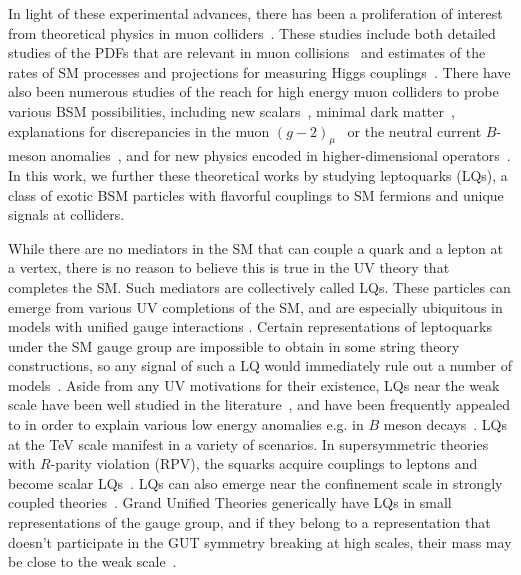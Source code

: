 \documentclass[a4paper,11pt]{article}
\begin{document}
In light of these experimental advances, there has been a proliferation of interest from theoretical physics in muon colliders~\cite{Ali:2021xlw}. 
These studies include both detailed studies of the PDFs that are relevant in muon collisions~\cite{Han:2020uid, Han:2021kes} and estimates of the rates of SM processes and projections for measuring Higgs couplings~\cite{Chiesa:2020awd, Costantini:2020stv, Han:2020pif}.
There have also been numerous studies of the reach for high energy muon colliders to probe various BSM possibilities, including 
new scalars~\cite{Eichten:2013ckl, Chakrabarty:2014pja, Buttazzo:2018qqp, Bandyopadhyay:2020otm, Han:2021udl, Liu:2021jyc}, 
minimal dark matter~\cite{Han:2020uak, Capdevilla:2021fmj, Bottaro:2021srh}, 
explanations for discrepancies in the muon $(g-2)_{\mu}$~\cite{Capdevilla:2020qel, Buttazzo:2020eyl, Capdevilla:2021rwo, Chen:2021rnl, Yin:2020afe} 
or the neutral current $B$-meson anomalies~\cite{Huang:2021nkl, Huang:2021biu}, 
and for new physics encoded in higher-dimensional operators~\cite{DiLuzio:2018jwd,Buttazzo:2020uzc}. 
In this work, we further these theoretical works by studying leptoquarks (LQs), a class of exotic BSM particles with flavorful couplings to SM fermions and unique signals at colliders.




While there are no mediators in the SM that can couple a quark and a lepton at a vertex, there is no reason to believe this is true in the UV theory that completes the SM. 
Such mediators are collectively called LQs.
These particles can emerge from various UV completions of the SM,
and are especially ubiquitous in models with unified gauge interactions \cite{Pati:1973uk, Pati:1974yy, Georgi:1974sy}. 
Certain representations of leptoquarks under the SM gauge group are impossible to obtain in some string theory constructions, so any signal of such a LQ would immediately rule out a number of models~\cite{Ibanez:2012zz}. 
Aside from any UV motivations for their existence, LQs near the weak scale have been well studied in the literature~\cite{Bandyopadhyay:2016oif, Dey:2017ede, Bandyopadhyay:2018syt, Roy:2018nwc, Mandal:2018czf, Chandak:2019iwj, Padhan:2019dcp, Bhaskar:2020kdr, Buonocore:2020erb, Greljo:2020tgv, Bandyopadhyay:2020jez, Crivellin:2021egp}, 
and have been frequently appealed to in order to explain various low energy anomalies e.g. in $B$ meson decays~\cite{Barbieri:2011ci, Barbieri:2015yvd, Fajfer:2015ycq, Bauer:2015knc, Aydemir:2018cbb, Biswas:2018snp, Biswas:2018iak, Aydemir:2019ynb, Hou:2019wiu, Bandyopadhyay:2020klr, Haisch:2020xjd, Cornella:2021sby}.
LQs at the TeV scale manifest in a variety of scenarios.
In supersymmetric theories with $R$-parity violation (RPV), the squarks acquire couplings to leptons and become scalar LQs~\cite{Dawson:1985vr}.
LQs can also emerge near the confinement scale in strongly coupled theories~\cite{Schrempp:1984nj}.
Grand Unified Theories generically have LQs in small representations of the gauge group, and if they belong to a representation that doesn't participate in the GUT symmetry breaking at high scales, their mass may be close to the weak scale~\cite{Frampton:1991ay}.
\end{document}
